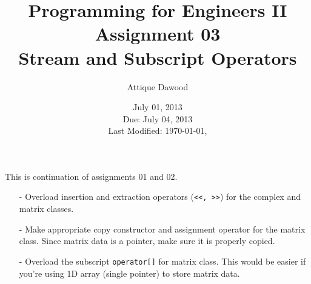 \documentclass[12pt,a4paper]{article}
\title{\vspace{-2cm}Programming for Engineers II\\Assignment 03\\Stream and Subscript Operators}
\author{Attique Dawood}
\date{July 01, 2013\\Due: July 04, 2013\\[0.2cm] Last Modified: \today, \currenttime}
\begin{document}
\maketitle
\noindent This is continuation of assignments 01 and 02.
\begin{enumerate}
\item[-] Overload insertion and extraction operators (\verb|<<, >>|) for the complex and matrix classes.
\item[-] Make appropriate copy constructor and assignment operator for the matrix class. Since matrix data is a pointer, make sure it is properly copied.
\item[-] Overload the subscript \verb|operator[]| for matrix class. This would be easier if you're using 1D array (single pointer) to store matrix data.
\end{enumerate}
\end{document}

